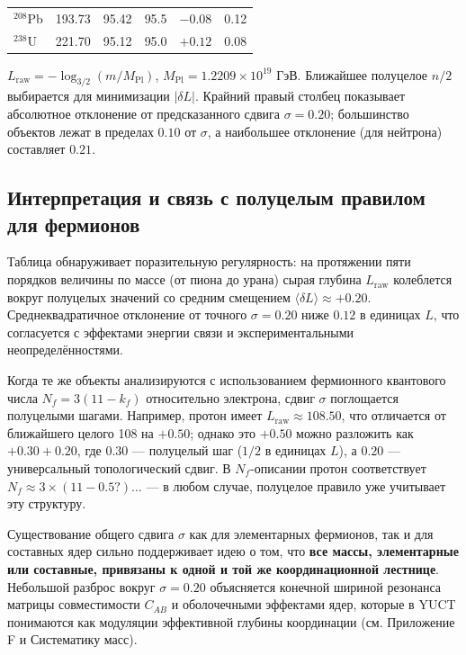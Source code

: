\documentclass[12pt,a4paper]{article}
\begin{document}
\begin{table}[htbp]
\begin{tabular}{l c c c c c}
			\(^{208}\)Pb & 193.73 & 95.42  & 95.5  & \(-0.08\) & 0.12 \\
			\(^{238}\)U & 221.70 & 95.12  & 95.0  & \(+0.12\) & 0.08 \\
			\bottomrule
		\end{tabular}
		\par\smallskip
		\footnotesize
		\(L_{\mathrm{raw}} = -\log_{3/2}(m/M_{\mathrm{Pl}})\), \(M_{\mathrm{Pl}} = 1.2209\times10^{19}\) ГэВ. Ближайшее полуцелое \(n/2\) выбирается для минимизации \(|\delta L|\). Крайний правый столбец показывает абсолютное отклонение от предсказанного сдвига \(\sigma = 0.20\); большинство объектов лежат в пределах \(0.10\) от \(\sigma\), а наибольшее отклонение (для нейтрона) составляет \(0.21\).
	\end{table}
	
	\subsection{Интерпретация и связь с полуцелым правилом для фермионов}
	
	Таблица обнаруживает поразительную регулярность: на протяжении пяти порядков величины по массе (от пиона до урана) сырая глубина \(L_{\mathrm{raw}}\) колеблется вокруг полуцелых значений со средним смещением \(\langle \delta L \rangle \approx +0.20\). Среднеквадратичное отклонение от точного \(\sigma = 0.20\) ниже \(0.12\) в единицах \(L\), что согласуется с эффектами энергии связи и экспериментальными неопределённостями.
	
	Когда те же объекты анализируются с использованием фермионного квантового числа \(N_f = 3(11 - k_f)\) относительно электрона, сдвиг \(\sigma\) поглощается полуцелыми шагами. Например, протон имеет \(L_{\mathrm{raw}} \approx 108.50\), что отличается от ближайшего целого 108 на \(+0.50\); однако это \(+0.50\) можно разложить как \(+0.30 + 0.20\), где \(0.30\) — полуцелый шаг (\(1/2\) в единицах \(L\)), а \(0.20\) — универсальный топологический сдвиг. В \(N_f\)-описании протон соответствует \(N_f \approx 3 \times (11 - 0.5?) \dots\) — в любом случае, полуцелое правило уже учитывает эту структуру.
	
	Существование общего сдвига \(\sigma\) как для элементарных фермионов, так и для составных ядер сильно поддерживает идею о том, что \textbf{все массы, элементарные или составные, привязаны к одной и той же координационной лестнице}. Небольшой разброс вокруг \(\sigma=0.20\) объясняется конечной шириной резонанса матрицы совместимости \(C_{AB}\) и оболочечными эффектами ядер, которые в YUCT понимаются как модуляции эффективной глубины координации (см. Приложение F и Систематику масс).
	
\end{document}
